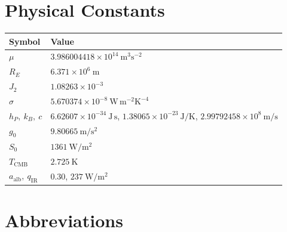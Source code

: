 \documentclass[
  11pt,
  openany,
  oneside]{book}
\newcounter{none} %
\begin{document}
\chapter{Physical Constants}\label{physical-constants}

{\def\LTcaptype{none} %
\begin{longtable}[]{@{}
  >{\raggedright\arraybackslash}p{}
  >{\raggedright\arraybackslash}p{}@{}}
\toprule\noalign{}
\begin{minipage}[b]{\linewidth}\raggedright
Symbol
\end{minipage} & \begin{minipage}[b]{\linewidth}\raggedright
Value
\end{minipage} \\
\midrule\noalign{}
\endhead
\bottomrule\noalign{}
\endlastfoot
\(\mu\) & \(3.986004418\times10^{14}\ \mathrm{m^3 s^{-2}}\) \\
\(R_E\) & \(6.371\times10^{6}\ \mathrm{m}\) \\
\(J_2\) & \(1.08263\times10^{-3}\) \\
\(\sigma\) & \(5.670374\times10^{-8}\ \mathrm{W\,m^{-2}K^{-4}}\) \\
\(h_P,\ k_B,\ c\) & \(6.62607\times10^{-34}\ \mathrm{J\,s}\),
\(1.38065\times10^{-23}\ \mathrm{J/K}\),
\(2.99792458\times10^{8}\ \mathrm{m/s}\) \\
\(g_0\) & \(9.80665\ \mathrm{m/s^2}\) \\
\(S_0\) & \(1361\ \mathrm{W/m^2}\) \\
\(T_{\mathrm{CMB}}\) & \(2.725\ \mathrm{K}\) \\
\(a_{\mathrm{alb}},\ q_{\mathrm{IR}}\) & \(0.30\),
\(237\ \mathrm{W/m^2}\) \\
\end{longtable}
}

\chapter{Abbreviations}\label{abbreviations}
\end{document}
